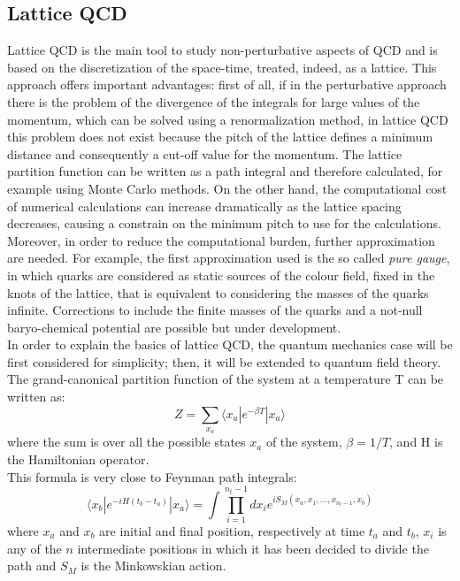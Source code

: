 \subsection{Lattice QCD}
Lattice QCD is the main tool to study non-perturbative aspects of QCD and is based on the discretization of the space-time, treated, indeed, as a lattice. This approach offers important advantages: first of all, if in the perturbative approach there is the problem of the divergence of the integrals for large values of the momentum, which can be solved using a renormalization method, in lattice QCD this problem does not exist because the pitch of the lattice defines a minimum distance and consequently a cut-off value for the momentum. The lattice partition function can be written as a path integral and therefore calculated, for example using Monte Carlo methods. On the other hand, the computational cost of numerical calculations can increase dramatically as the lattice spacing decreases, causing a constrain on the minimum pitch to use for the calculations. Moreover, in order to reduce the computational burden, further approximation are needed. For example, the first approximation used is the so called \textit{pure gauge}, in which quarks are considered as static sources of the colour field, fixed in the knots of the lattice, that is equivalent to considering the masses of the quarks infinite. Corrections to include the finite masses of the quarks and a not-null baryo-chemical potential are possible but under development.\\
In order to explain the basics of lattice QCD, the quantum mechanics case will be first considered for simplicity; then, it will be extended to quantum field theory.
The grand-canonical partition function of the system at a temperature T can be written as:
%
\begin{equation}
 Z = \sum\limits_{x_{a}}\langle x_{a} | e^{-\beta T} | x_{a} \rangle
\end{equation}
%
where the sum is over all the possible states $x_{a}$ of the system, $\beta=1/T$, and H is the Hamiltonian operator.\\
This formula is very close to Feynman path integrals:
%
\begin{equation}
 \langle x_{b} | e^{- i H (t_{b} - t_{a})} | x_{a} \rangle = \int \prod\limits_{i=1}^{n_{t}-1} dx_{i} e^{i S_{M}(x_{a},x_{1},\dots,x_{n_{t}-1},x_{b})}
\end{equation}
where $x_{a}$ and $x_{b}$ are initial and final position, respectively at time $t_{a}$ and  $t_{b}$, $x_{i}$ is any of the $n$ intermediate positions in which it has been decided to divide the path and $S_{M}$ is the Minkowskian action.\\

